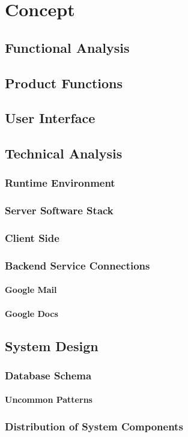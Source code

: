 \chapter{Concept}
\label{chapter:Concept}

\section{Functional Analysis}

\section{Product Functions}

\section{User Interface}

\section{Technical Analysis}

\subsection{Runtime Environment}

\subsection{Server Software Stack}

\subsection{Client Side}

\subsection{Backend Service Connections}

\subsubsection{Google Mail}

\subsubsection{Google Docs}


\section{System Design}

\subsection{Database Schema}

\subsubsection{Uncommon Patterns}

\subsection{Distribution of System Components}




